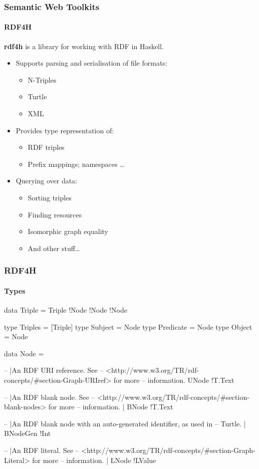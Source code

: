 \documentclass{beamer}
\begin{document}
\begin{frame}
\frametitle{Semantic Web Toolkits}
\framesubtitle{RDF4H}

\textbf{rdf4h} is a library for working with RDF in Haskell.

\begin{itemize}
\item Supports parsing and serialisation of file formats:

\begin{itemize}
\item N-Triples
\item Turtle
\item XML
\end{itemize}

\item Provides type representation of:

\begin{itemize}
\item RDF triples
\item Prefix mappings; namespaces \ldots
\end{itemize}

\item Querying over data:

\begin{itemize}
\item Sorting triples
\item Finding resources
\item Isomorphic graph equality
\item And other stuff\ldots

\end{itemize}

\end{itemize}

\end{frame}


\begin{frame}[fragile]
\frametitle{RDF4H}
\framesubtitle{Types}

\begin{haskellcode}
data Triple =
      Triple !Node !Node !Node

type Triples = [Triple]
type Subject = Node
type Predicate = Node
type Object = Node

data Node =

  -- |An RDF URI reference. See
  -- <http://www.w3.org/TR/rdf-concepts/#section-Graph-URIref> for more
  -- information.
  UNode !T.Text

  -- |An RDF blank node. See
  -- <http://www.w3.org/TR/rdf-concepts/#section-blank-nodes> for more
  -- information.
  | BNode !T.Text

  -- |An RDF blank node with an auto-generated identifier, as used in
  -- Turtle.
  | BNodeGen !Int

  -- |An RDF literal. See
  -- <http://www.w3.org/TR/rdf-concepts/#section-Graph-Literal> for more
  -- information.
  | LNode !LValue
\end{haskellcode}

\end{frame}
\end{document}
